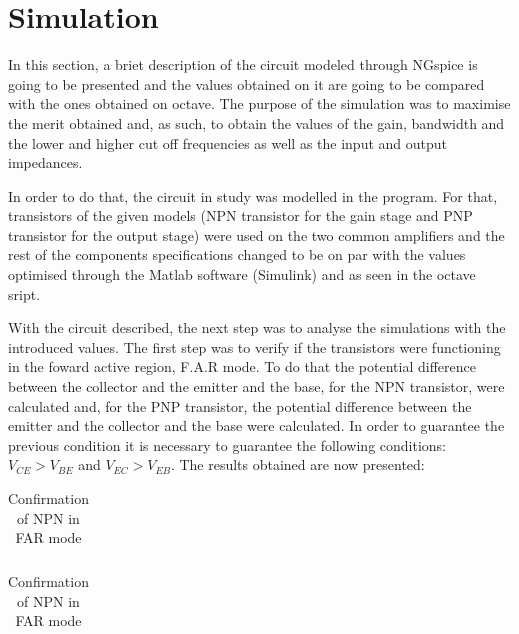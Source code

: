 \section{Simulation}
\label{sec:simulation}

\par In this section, a briet description of the circuit modeled through NGspice is going to be presented and the values obtained on it are going to be compared with the ones obtained on octave. The purpose of the simulation was to maximise the merit obtained and, as such, to obtain the values of the gain, bandwidth and the lower and higher  cut off frequencies as well as the input and output impedances.

\par In order to do that, the circuit in study was modelled in the program. For that, transistors of the given models (NPN transistor for the gain stage and PNP transistor for the output stage) were used on the two common amplifiers and the rest of the components specifications changed to be on par with the values optimised through the Matlab software (Simulink) and as seen in the octave sript.

\par With the circuit described, the next step was to analyse the simulations with the introduced values. The first step was to verify if the transistors were functioning in the foward active region, F.A.R mode. To do that the potential difference between the collector and the emitter and the base, for the NPN transistor, were calculated and, for the PNP transistor, the potential difference between the emitter and the collector and the base were calculated. In order to guarantee the previous condition it is necessary to guarantee the following conditions: $V_{CE}>V_{BE}$ and $V_{EC}>V_{EB}$. The results obtained are now presented:

\begin{table}[ht]
  \centering
  \begin{tabular}{|l|r|}
    \hline    
   
     \end{tabular}
  \caption{Confirmation of NPN in FAR mode}
 
\end{table}


\begin{table}[ht]
  \centering
  \begin{tabular}{|l|r|}
    \hline    
   
     \end{tabular}
  \caption{Confirmation of NPN in FAR mode}
    
\end{table}

